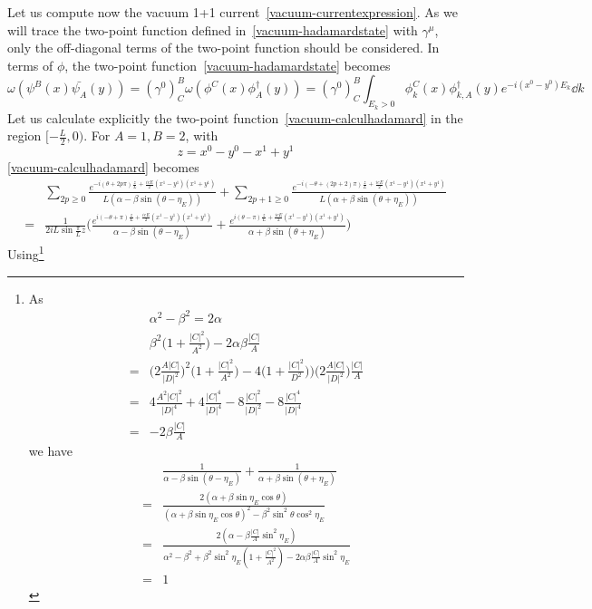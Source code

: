 Let us compute now the vacuum 1+1 current~\cref{vacuum-currentexpression}.
As we will trace the two-point function defined in~\cref{vacuum-hadamardstate} with $\gamma^\mu$, 
only the off-diagonal terms of the two-point function should be considered.
In terms of $\phi$, 
the two-point function~\cref{vacuum-hadamardstate} becomes
\begin{equation}\label{vacuum-calculhadamard}
\omega(\psi^B(x) \bar{\psi_A}(y)) = 
(\gamma^0)^B_C \omega(\phi^C(x) \phi^\dagger_A(y)) = (\gamma^0)^B_C
\int_{E_k > 0} \phi^C_k(x) \phi^\dagger_{k,A}(y) e^{-i(x^0 - y^0) E_k} \dd k
\end{equation}
Let us calculate explicitly the two-point function~\cref{vacuum-calculhadamard} in the region $[-\frac L 2,0)$. 
For $A =1, B= 2$, 
with 
\begin{equation*}
z =x^0 - y^0 - x^1 +y^1
\end{equation*}
\cref{vacuum-calculhadamard} becomes
\begin{equation*}
\begin{split}
& \sum_{2p \geq 0} \frac{e^{-i(\theta + 2p\pi)\frac{z}{L}+ \frac{ieE}{2}(x^1 - y^1)(x^1+y^1)} }{L(\alpha - \beta \sin (\theta - \eta_E))} 
+ \sum_{2p+1 \geq 0} \frac{e^{-i(- \theta + (2p+2)\pi)\frac{z}{L}+ \frac{ieE}{2}(x^1 - y^1)(x^1+y^1)}}{L(\alpha + \beta \sin (\theta + \eta_E))}\\
%
=& 
\frac{1}{2i L\sin\frac{\pi}{L}z} \bigg( \frac{e^{i(-\theta + \pi)\frac{z}{L}+ \frac{ieE}{2}(x^1 - y^1)(x^1+y^1)}}{\alpha - \beta \sin (\theta - \eta_E)}
+ \frac{e^{i(\theta - \pi) \frac{z}{L}+ \frac{ieE}{2}(x^1 - y^1)(x^1+y^1)}}{\alpha + \beta \sin (\theta + \eta_E)}
\bigg)
\end{split}
\end{equation*}
Using\footnote{
As
\begin{equation*}
\begin{split}
& \alpha^2 - \beta ^ 2 = 2 \alpha \\
&  \beta^2 \big(1 + \frac{|C|^2}{A^2} \big) - 2 \alpha \beta \frac{|C|}{A} \\
= & \big(2\frac{A |C|}{|D|^2} \big)^2 \big( 1+ \frac{|C|^2}{A^2} \big) - 4\big( 1+ \frac{|C|^2}{D^2}))\big(2\frac{A |C|}{|D|^2} \big) \frac{|C|}{A}  \\
= & 4 \frac{A^2 |C|^2}{|D|^4} + 4\frac{|C|^4}{|D|^4} - 8\frac{|C|^2}{|D|^2} - 8\frac{|C|^4}{|D|^4} \\
= & -2 \beta \frac{|C|}{A}
\end{split}
\end{equation*}
we have
\begin{equation*}
\begin{split}
& \frac{1}{\alpha - \beta \sin (\theta - \eta_E)}
   + \frac{1}{\alpha + \beta \sin (\theta + \eta_E)} \\
= & \frac{2(\alpha + \beta \sin \eta_E \cos \theta)}{(\alpha + \beta \sin \eta_E \cos \theta)^2 - \beta^2 \sin^2 \theta \cos^2 \eta_E} \\
= & \frac{2(\alpha - \beta \frac{|C|}{A} \sin^2 \eta_E)}{\alpha^2 - \beta^2 + \beta^2 \sin^2 \eta_E (1 + \frac{|C|^2}{A^2}) - 2 \alpha \beta \frac{|C|}{A} \sin^2 \eta_E} \\
=& 1
\end{split}
\end{equation*}
}
